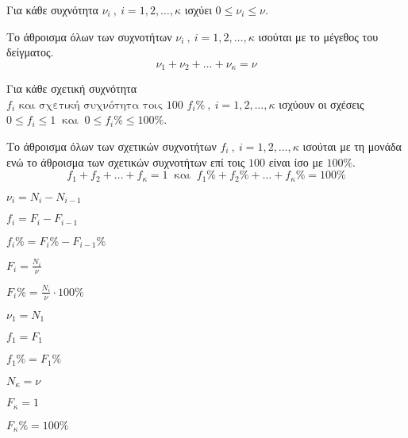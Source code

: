 \documentclass[twoside,11pt,a4paper,openany]{book}
\begin{document}
\begin{rlist}
\item Για κάθε συχνότητα $ \nu_i\ ,\ i=1,2,\ldots,\kappa $ ισχύει $ 0\leq\nu_i\leq\nu $.
\item Το άθροισμα όλων των συχνοτήτων $ \nu_i\ ,\ i=1,2,\ldots,\kappa $ ισούται με το μέγεθος του δείγματος.
\[ \nu_1+\nu_2+\ldots+\nu_\kappa=\nu \]
\item Για κάθε σχετική συχνότητα $ f_i\textrm{ και σχετική συχνότητα τοις 100 }f_i\%\ ,\ i=1,2,\ldots,\kappa $ ισχύουν οι σχέσεις $ 0\leq f_i\leq 1\ \textrm{ και }\ 0\leq f_i\%\leq100\% $.
\item Το άθροισμα όλων των σχετικών συχνοτήτων $ f_i\ ,\ i=1,2,\ldots,\kappa $ ισούται με τη μονάδα ενώ το άθροισμα των σχετικών συχνοτήτων επί τοις $ 100 $ είναι ίσο με $ 100\% $.
\[ f_1+f_2+\ldots+f_\kappa=1\ \textrm{ και }\ f_1\%+f_2\%+\ldots+f_\kappa\%=100\% \]
\begin{multicols}{3}
\item $ \nu_i=N_i-N_{i-1} $
\item $ f_i=F_i-F_{i-1} $
\item $ f_i\%=F_i\%-F_{i-1}\% $
\item $ F_i=\frac{N_i}{\nu} $
\item $ F_i\%=\frac{N_i}{\nu}\cdot 100\% $
\item $ \nu_1=N_1 $
\item $ f_1=F_1 $
\item $ f_1\%=F_1\% $
\item $ N_\kappa=\nu $
\item $ F_\kappa=1 $
\item $ F_\kappa\%=100\% $
\end{multicols}
\end{rlist}
\end{document}
